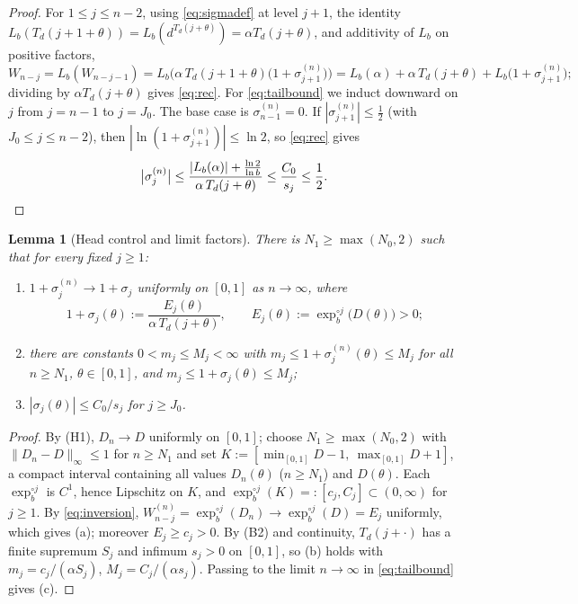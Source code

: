 \documentclass[11pt]{article}
\newtheorem{lemma}[theorem]{Lemma}
\theoremstyle{definition}
\theoremstyle{remark}
\newcommand{\Lb}{L_{b}}
\newcommand{\Td}{T_{d}}
\newcommand{\expb}{\exp_{b}}
\begin{document}
\begin{proof}
For $1\le j\le n-2$, using \eqref{eq:sigmadef} at level $j+1$, the
identity $\Lb(\Td(j+1+\theta))=\Lb(d^{\Td(j+\theta)})=\alpha\Td(j+\theta)$,
and additivity of $\Lb$ on positive factors,
\[
W_{n-j}=\Lb(W_{n-j-1})
=\Lb\Big(\alpha\,\Td(j+1+\theta)\big(1+\sigma_{j+1}^{(n)}\big)\Big)
=\Lb(\alpha)+\alpha\,\Td(j+\theta)+\Lb\big(1+\sigma_{j+1}^{(n)}\big);
\]
dividing by $\alpha\Td(j+\theta)$ gives \eqref{eq:rec}. For
\eqref{eq:tailbound} we induct downward on $j$ from $j=n-1$ to $j=J_0$.
The base case is $\sigma_{n-1}^{(n)}=0$. If
$|\sigma_{j+1}^{(n)}|\le\frac12$ (with $J_0\le j\le n-2$), then
$|\ln(1+\sigma_{j+1}^{(n)})|\le\ln2$, so \eqref{eq:rec} gives
\[
\big|\sigma_j^{(n)}\big|
\le\frac{|\Lb(\alpha)|+\frac{\ln2}{\ln b}}{\alpha\,\Td(j+\theta)}
\le\frac{C_0}{s_j}\le\frac12 .
\qedhere
\]
\end{proof}

\begin{lemma}[Head control and limit factors]\label{lem:head}
There is $N_1\ge\max(N_0,2)$ such that for every fixed $j\ge1$:
\begin{enumerate}
\item[\textup{(a)}] $1+\sigma_j^{(n)}\to 1+\sigma_j$ uniformly on
$[0,1]$ as $n\to\infty$, where
\[
1+\sigma_j(\theta):=\frac{E_j(\theta)}{\alpha\,\Td(j+\theta)},
\qquad
E_j(\theta):=\expb^{\circ j}\big(D(\theta)\big)>0 ;
\]
\item[\textup{(b)}] there are constants $0<m_j\le M_j<\infty$ with
$m_j\le 1+\sigma_j^{(n)}(\theta)\le M_j$ for all $n\ge N_1$,
$\theta\in[0,1]$, and $m_j\le 1+\sigma_j(\theta)\le M_j$;
\item[\textup{(c)}] $|\sigma_j(\theta)|\le C_0/s_j$ for $j\ge J_0$.
\end{enumerate}
\end{lemma}

\begin{proof}
By (H1), $D_n\to D$ uniformly on $[0,1]$; choose $N_1\ge\max(N_0,2)$ with
$\|D_n-D\|_\infty\le1$ for $n\ge N_1$ and set
$K:=[\min_{[0,1]}D-1,\ \max_{[0,1]}D+1]$, a compact interval containing
all values $D_n(\theta)$ ($n\ge N_1$) and $D(\theta)$. Each
$\expb^{\circ j}$ is $C^{1}$, hence Lipschitz on $K$, and
$\expb^{\circ j}(K)=:[c_j,C_j]\subset(0,\infty)$ for $j\ge1$. By
\eqref{eq:inversion}, $W_{n-j}^{(n)}=\expb^{\circ j}(D_n)\to
\expb^{\circ j}(D)=E_j$ uniformly, which gives (a); moreover
$E_j\ge c_j>0$. By (B2) and continuity, $\Td(j+\cdot)$ has a finite
supremum $S_j$ and infimum $s_j>0$ on $[0,1]$, so (b) holds with
$m_j=c_j/(\alpha S_j)$, $M_j=C_j/(\alpha s_j)$. Passing to the limit
$n\to\infty$ in \eqref{eq:tailbound} gives (c).
\end{proof}
\end{document}
